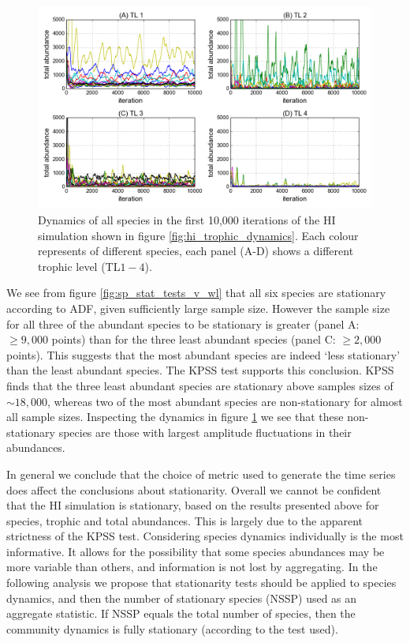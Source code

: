 \begin{figure}[ht!]
	\centering
	\includegraphics[width=1.0\linewidth]{"./chapters/chapter04b/figures/hi_sp_by_tl_part10000"}
    \caption{Dynamics of all species in the first 10,000 iterations of the HI simulation shown in figure \ref{fig:hi_trophic_dynamics}. Each colour represents of different species, each panel (A-D) shows a different trophic level (TL$1-4$).}    
    \label{fig:dynamics_by_species}
\end{figure}

We see from figure \ref{fig:sp_stat_tests_v_wl} that all six species are stationary according to ADF, given sufficiently large sample size. However the sample size for all three of the abundant species to be stationary is greater (panel A: $\geq 9,000$ points) than for the three least abundant species (panel C: $\geq 2,000$ points). This suggests that the most abundant species are indeed `less stationary' than the least abundant species. The KPSS test supports this conclusion. KPSS finds that the three least abundant species are stationary above samples sizes of $\sim 18,000$, whereas two of the most abundant species are non-stationary for almost all sample sizes. Inspecting the dynamics in figure \ref{fig:dynamics_by_species} we see that these non-stationary species are those with largest amplitude fluctuations in their abundances. 

In general we conclude that the choice of metric used to generate the time series does affect the conclusions about stationarity. Overall we cannot be confident that the HI simulation is stationary, based on the results presented above for species, trophic and total abundances. This is largely due to the apparent strictness of the KPSS test. Considering species dynamics individually is the most informative. It allows for the possibility that some species abundances may be more variable than others, and information is not lost by aggregating.  In the following analysis we propose that stationarity tests should be applied to species dynamics, and then the number of stationary species (NSSP) used as an aggregate statistic. If NSSP equals the total number of species, then the community dynamics is fully stationary (according to the test used).   

